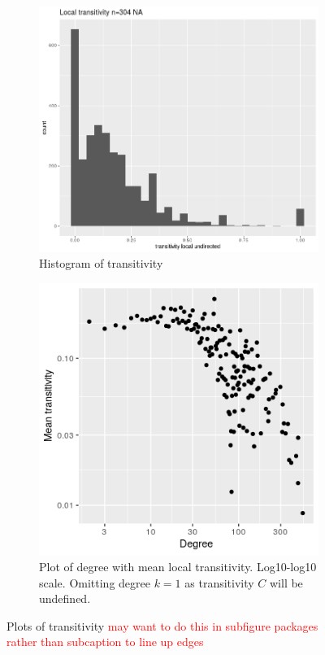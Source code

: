 \begin{figure}
    \centering
    \begin{subfigure}[t]{0.45\textwidth}
        \centering
        \includegraphics[width=\linewidth]{images/Rplot_transitivity.png} 
        \caption{Histogram of transitivity} \label{fig:transitivity}
    \end{subfigure}
    \hfill
    \begin{subfigure}[t]{0.45\textwidth}
        \centering
        \includegraphics[width=\linewidth]{images/Rplot01_logdegree_log_transitivity.png} 
        \caption{Plot of degree with mean local transitivity. Log10-log10 scale. Omitting degree $k=1$ as transitivity $C$ will be undefined.} \label{fig:log_transitivity_degree}
    \end{subfigure}
    \caption{Plots of transitivity \textcolor{red}{may want to do this in subfigure packages rather than subcaption to line up edges}}
\end{figure}



